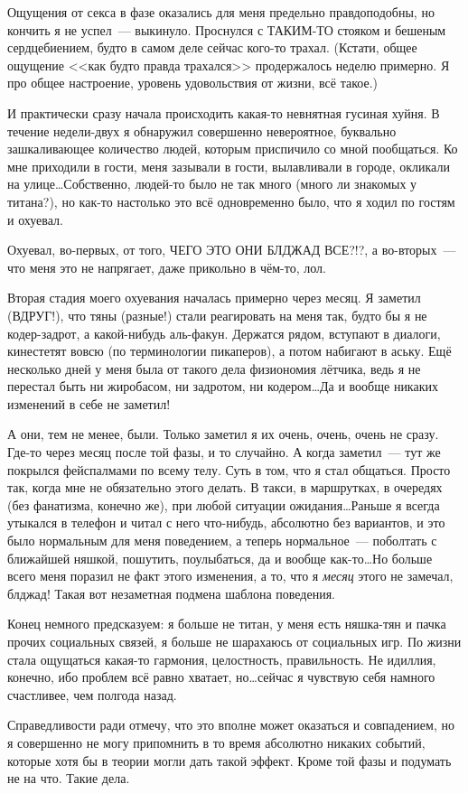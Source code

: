 \documentclass[a4paper,14pt,oneside]{memoir}
\begin{document}
\begin{shaded}
Ощущения от секса в фазе оказались для меня предельно правдоподобны, но кончить я не успел~--- выкинуло. Проснулся с ТАКИМ-ТО стояком и бешеным сердцебиением, будто в самом деле сейчас кого-то трахал. (Кстати, общее ощущение <<как будто правда трахался>> продержалось неделю примерно. Я про общее настроение, уровень удовольствия от жизни, всё такое.)

И практически сразу начала происходить какая-то невнятная гусиная хуйня. В течение недели-двух я обнаружил совершенно невероятное, буквально зашкаливающее количество людей, которым приспичило со мной пообщаться. Ко мне приходили в гости, меня зазывали в гости, вылавливали в городе, окликали на улице\ldots Собственно, людей-то было не так много (много ли знакомых у титана?), но как-то настолько это всё одновременно было, что я ходил по гостям и охуевал. 

Охуевал, во-первых, от того, ЧЕГО ЭТО ОНИ БЛДЖАД ВСЕ?!?, а во-вторых~--- что меня это не напрягает, даже прикольно в чём-то, лол.

Вторая стадия моего охуевания началась примерно через месяц. Я заметил (ВДРУГ!), что тяны (разные!) стали реагировать на меня так, будто бы я не кодер-задрот, а какой-нибудь аль-факун. Держатся рядом, вступают в диалоги, кинестетят вовсю (по терминологии пикаперов), а потом набигают в аську. Ещё несколько дней у меня была от такого дела физиономия лётчика, ведь я не перестал быть ни жиробасом, ни задротом, ни кодером\ldots Да и вообще никаких изменений в себе не заметил!

А они, тем не менее, были. Только заметил я их очень, очень, очень не сразу. Где-то через месяц после той фазы, и то случайно. А когда заметил~--- тут же покрылся фейспалмами по всему телу. Суть в том, что я стал общаться. Просто так, когда мне не обязательно этого делать. В такси, в маршрутках, в очередях (без фанатизма, конечно же), при любой ситуации ожидания\ldots Раньше я всегда утыкался в телефон и читал с него что-нибудь, абсолютно без вариантов, и это было нормальным для меня поведением, а теперь нормальное~--- поболтать с ближайшей няшкой, пошутить, поулыбаться, да и вообще как-то\ldots Но больше всего меня поразил не факт этого изменения, а то, что я \textit{месяц} этого не замечал, блджад! Такая вот незаметная подмена шаблона поведения.

Конец немного предсказуем: я больше не титан, у меня есть няшка-тян и пачка прочих социальных связей, я больше не шарахаюсь от социальных игр. По жизни стала ощущаться какая-то гармония, целостность, правильность. Не идиллия, конечно, ибо проблем всё равно хватает, но\ldots сейчас я чувствую себя намного счастливее, чем полгода назад.

Справедливости ради отмечу, что это вполне может оказаться и совпадением, но я совершенно не могу припомнить в то время абсолютно никаких событий, которые хотя бы в теории могли дать такой эффект. Кроме той фазы и подумать не на что. Такие дела.
\end{shaded}
\end{document}
